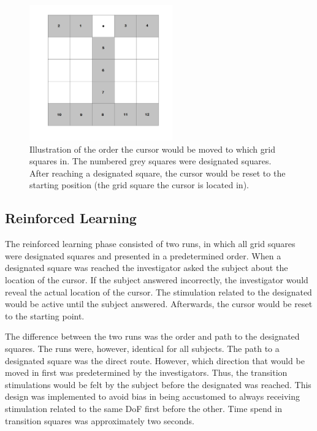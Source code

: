 \begin{figure}[H]                 
	\includegraphics[width=0.55\textwidth]{figures/gridmap_FBfam}  
	\caption{Illustration of the order the cursor would be moved to which grid squares in. The numbered grey squares were designated squares. After reaching a designated square, the cursor would be reset to the starting position (the grid square the cursor is located in).}
	\label{fig:gridmap_FBfam} 
\end{figure}

\subsection{Reinforced Learning} \label{sec:meth:FBtrainingRe}
The reinforced learning phase consisted of two runs, in which all grid squares were designated squares and presented in a predetermined order. When a designated square was reached the investigator asked the subject about the location of the cursor. If the subject answered incorrectly, the investigator would reveal the actual location of the cursor. The stimulation related to the designated would be active until the subject answered. Afterwards, the cursor would be reset to the starting point. 

The difference between the two runs was the order and path to the designated squares. The runs were, however, identical for all subjects. The path to a designated square was the direct route. However, which direction that would be moved in first was predetermined by the investigators. Thus, the transition stimulations would be felt by the subject before the designated was reached. This design was implemented to avoid bias in being accustomed to always receiving stimulation related to the same DoF first before the other. Time spend in transition squares was approximately two seconds. 
